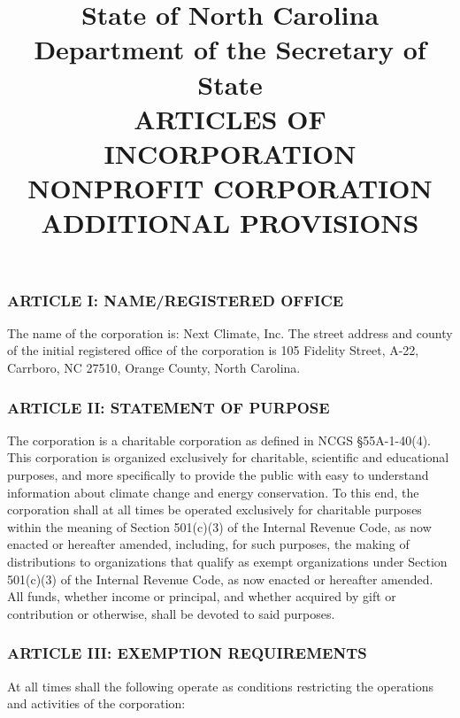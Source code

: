 \documentclass[12pt]{article}
\begin{document}
\setcounter{page}{3}

\title{State of North Carolina Department of the Secretary of State\\
  \Large{ARTICLES OF INCORPORATION \\NONPROFIT CORPORATION\\ADDITIONAL
    PROVISIONS}}
\maketitle

\noindent
\subsubsection*{ARTICLE I: NAME/REGISTERED OFFICE}

The name of the corporation is: Next Climate, Inc. The street address
and county of the initial registered office of the corporation is 105
Fidelity Street, A-22, Carrboro, NC 27510, Orange County, North
Carolina.

\subsubsection*{ARTICLE II: STATEMENT OF PURPOSE}

The corporation is a charitable corporation as defined in
NCGS \S 55A-1-40(4). This corporation is organized exclusively for
charitable, scientific and educational purposes, and more specifically
to provide the public with easy to understand information about
climate change and energy conservation. To this end, the corporation
shall at all times be operated exclusively for charitable purposes
within the meaning of Section 501(c)(3) of the Internal Revenue Code,
as now enacted or hereafter amended, including, for such purposes, the
making of distributions to organizations that qualify as exempt
organizations under Section 501(c)(3) of the Internal Revenue Code, as
now enacted or hereafter amended. All funds, whether income or
principal, and whether acquired by gift or contribution or otherwise,
shall be devoted to said purposes.

\subsubsection*{ARTICLE III: EXEMPTION REQUIREMENTS}

At all times shall the following operate as conditions restricting the
operations and activities of the corporation:
\end{document}
